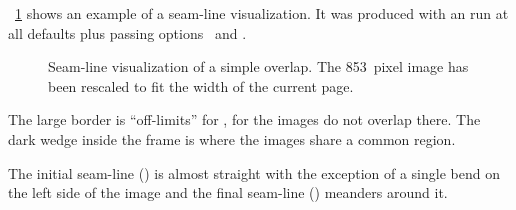 %
%
\figureName~\ref{fig:seam-line-visualization} shows an example of a seam-line visualization.  It
was produced with an \App{} run at all defaults plus passing options~ and
.

\begin{figure}
  \begin{maxipage}
    \centering
  \end{maxipage}

  \caption[Seam-line visualization]{\label{fig:seam-line-visualization}%
    Seam-line visualization of a simple overlap.  \ifhevea \relax\else The
    853~pixel image has been rescaled to fit the width of the current page.\fi}
\end{figure}

The large  border is ``off-limits'' for \App, for the
images do not overlap there.  The dark wedge inside the
 frame is where the images share a common region.

The initial seam-line () is almost straight with the
exception of a single bend on the left side of the image and the final seam-line
() meanders around it.


